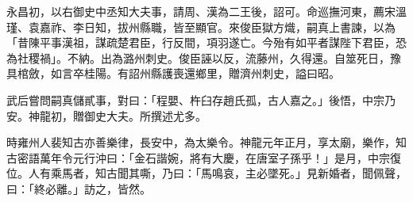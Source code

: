 \begin{pinyinscope}
 永昌初，以右御史中丞知大夫事，請周、漢為二王後，詔可。命巡撫河東，薦宋溫瑾、袁嘉祚、李日知，拔州縣職，皆至顯官。來俊臣獄方熾，嗣真上書諫，以為「昔陳平事漢祖，謀疏楚君臣，行反間，項羽遂亡。今殆有如平者謀陛下君臣，恐為社稷禍」。不納。出為潞州刺史。俊臣誣以反，流藤州，久得還。自筮死日，豫具棺斂，如言卒桂陽。有詔州縣護喪還鄉里，贈濟州刺史，謚曰昭。



 武后嘗問嗣真儲貳事，對曰：「程嬰、杵臼存趙氏孤，古人嘉之。」後悟，中宗乃安。神龍初，贈御史大夫。所撰述尤多。



 時雍州人裴知古亦善樂律，長安中，為太樂令。神龍元年正月，享太廟，樂作，知古密語萬年令元行沖曰：「金石諧婉，將有大慶，在唐室子孫乎！」是月，中宗復位。人有乘馬者，知古聞其嘶，乃曰：「馬鳴哀，主必墜死。」見新婚者，聞佩聲，曰：「終必離。」訪之，皆然。



\end{pinyinscope}